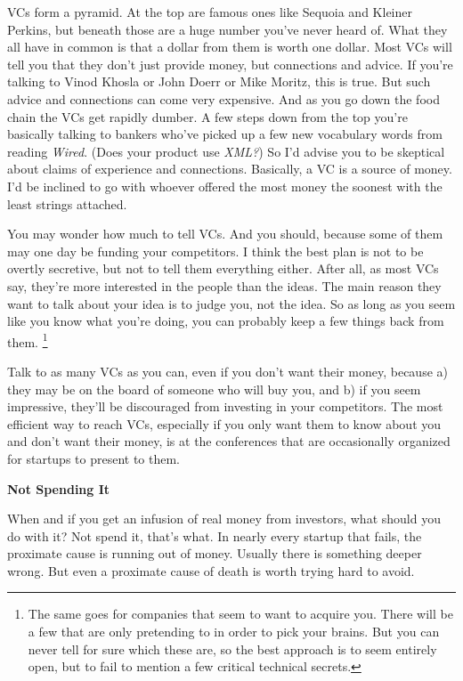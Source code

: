 \documentclass[12pt]{book}
\begin{document}
VCs form a pyramid. At the top are famous ones like Sequoia and Kleiner
Perkins, but beneath those are a huge number you've never heard of. What
they all have in common is that a dollar from them is worth one dollar.
Most VCs will tell you that they don't just provide money, but
connections and advice. If you're talking to Vinod Khosla or John Doerr
or Mike Moritz, this is true. But such advice and connections can come
very expensive. And as you go down the food chain the VCs get rapidly
dumber. A few steps down from the top you're basically talking to
bankers who've picked up a few new vocabulary words from reading
\emph{Wired}. (Does your product use \emph{XML?}) So I'd advise you to
be skeptical about claims of experience and connections. Basically, a VC
is a source of money. I'd be inclined to go with whoever offered the
most money the soonest with the least strings attached.

You may wonder how much to tell VCs. And you should, because some of
them may one day be funding your competitors. I think the best plan is
not to be overtly secretive, but not to tell them everything either.
After all, as most VCs say, they're more interested in the people than
the ideas. The main reason they want to talk about your idea is to judge
you, not the idea. So as long as you seem like you know what you're
doing, you can probably keep a few things back from them. \footnote{The same goes for companies that seem to want to acquire you.
There will be a few that are only pretending to in order to pick your
brains. But you can never tell for sure which these are, so the best
approach is to seem entirely open, but to fail to mention a few critical
technical secrets.}

Talk to as many VCs as you can, even if you don't want their money,
because a) they may be on the board of someone who will buy you, and b)
if you seem impressive, they'll be discouraged from investing in your
competitors. The most efficient way to reach VCs, especially if you only
want them to know about you and don't want their money, is at the
conferences that are occasionally organized for startups to present to
them.

\textbf{Not Spending It}

When and if you get an infusion of real money from investors, what
should you do with it? Not spend it, that's what. In nearly every
startup that fails, the proximate cause is running out of money. Usually
there is something deeper wrong. But even a proximate cause of death is
worth trying hard to avoid.
\end{document}
